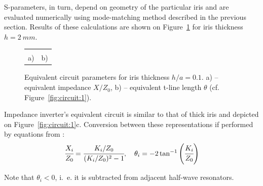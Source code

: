 \documentclass{pj}
\begin{document}
S-parameters, in turn, depend on geometry of the particular iris and
are evaluated numerically using mode-matching method described in
the previous section. Results of these calculations are shown on
Figure~\ref{fig:equiv-circuit} for iris thickness $h = 2~mm$.

\begin{figure}[h]
  \begin{tabular}{cc}
     &
                                           
    \\
    a) & b) \\
  \end{tabular}
  \caption{Equivalent circuit parameters for iris thickness $h/a = 0.1$. a) -- equivalent impedance
    $X/Z_0$, b) -- equivalent t-line length $\theta$ (cf. Figure~\ref{fig:circuit:1}).}
  \label{fig:equiv-circuit}
\end{figure}


Impedance inverter's equivalent circuit is similar to that of thick
iris and depicted on Figure~\ref{fig:circuit:1}c. Conversion between
these representations if performed by equations from \cite{pozar2012microwave}:
\begin{equation}
  \label{eq:impedance_transformer}
  \cfrac{X_i}{Z_0} = \cfrac{K_i/Z_0}{(K_i/Z_0)^2-1},
  \quad
  \theta_i = - 2 \tan^{-1}{\left(\cfrac{K_i}{Z_0}\right)}
\end{equation}

Note that $\theta_i < 0$, i.~e. it is subtracted from adjacent half-wave
resonators.
\end{document}
